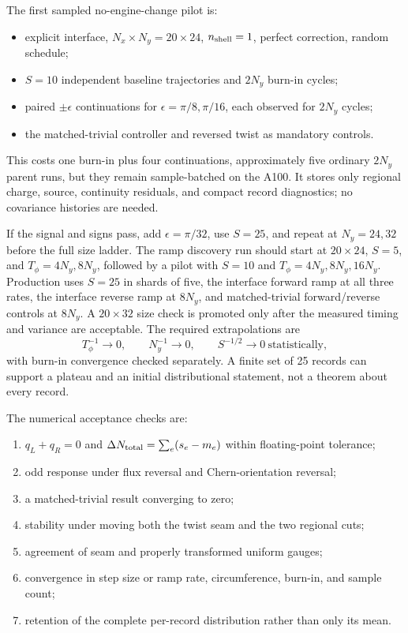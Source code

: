 \documentclass[aps,prb,onecolumn,nofootinbib,superscriptaddress]{revtex4-2}
\begin{document}
The first sampled no-engine-change pilot is:
\begin{itemize}
  \item explicit interface, $N_x\times N_y=20\times24$,
  $n_{\rm shell}=1$, perfect correction, random schedule;
  \item $S=10$ independent baseline trajectories and $2N_y$ burn-in cycles;
  \item paired $\pm\epsilon$ continuations for
  $\epsilon=\pi/8,\pi/16$, each observed for $2N_y$ cycles;
  \item the matched-trivial controller and reversed twist as mandatory
  controls.
\end{itemize}
This costs one burn-in plus four continuations, approximately five ordinary
$2N_y$ parent runs, but they remain sample-batched on the A100.  It stores only
regional charge, source, continuity residuals, and compact record diagnostics;
no covariance histories are needed.

If the signal and signs pass, add $\epsilon=\pi/32$, use $S=25$, and repeat at
$N_y=24,32$ before the full size ladder.  The ramp discovery run should start
at $20\times24$, $S=5$, and $T_\phi=4N_y,8N_y$, followed by a pilot with
$S=10$ and $T_\phi=4N_y,8N_y,16N_y$.  Production uses $S=25$ in shards of
five, the interface forward ramp at all three rates, the interface reverse
ramp at $8N_y$, and matched-trivial forward/reverse controls at $8N_y$.  A
$20\times32$ size check is promoted only after the measured timing and
variance are acceptable.  The required extrapolations are
\begin{equation}
  T_\phi^{-1}\to0,
  \qquad N_y^{-1}\to0,
  \qquad S^{-1/2}\to0\ \text{statistically},
  \label{eq:pump-limits}
\end{equation}
with burn-in convergence checked separately.  A finite set of 25 records can
support a plateau and an initial distributional statement, not a theorem about
every record.

The numerical acceptance checks are:
\begin{enumerate}
  \item $q_L+q_R=0$ and
  $\Delta N_{\rm total}=\sum_e(s_e-m_e)$ within floating-point tolerance;
  \item odd response under flux reversal and Chern-orientation reversal;
  \item a matched-trivial result converging to zero;
  \item stability under moving both the twist seam and the two regional cuts;
  \item agreement of seam and properly transformed uniform gauges;
  \item convergence in step size or ramp rate, circumference, burn-in, and
  sample count;
  \item retention of the complete per-record distribution rather than only
  its mean.
\end{enumerate}
\end{document}
